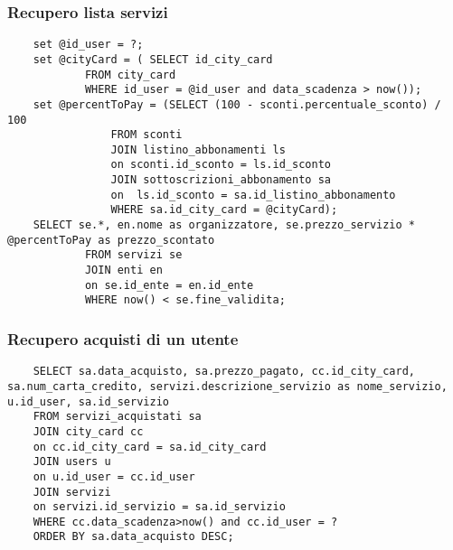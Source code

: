 \subsubsection{Recupero lista servizi}
\begin{lstlisting}
    set @id_user = ?;     
    set @cityCard = ( SELECT id_city_card
            FROM city_card
            WHERE id_user = @id_user and data_scadenza > now());
    set @percentToPay = (SELECT (100 - sconti.percentuale_sconto) / 100
                FROM sconti 
                JOIN listino_abbonamenti ls 
                on sconti.id_sconto = ls.id_sconto
                JOIN sottoscrizioni_abbonamento sa
                on  ls.id_sconto = sa.id_listino_abbonamento
                WHERE sa.id_city_card = @cityCard);
    SELECT se.*, en.nome as organizzatore, se.prezzo_servizio * @percentToPay as prezzo_scontato
            FROM servizi se
            JOIN enti en
            on se.id_ente = en.id_ente
            WHERE now() < se.fine_validita;
\end{lstlisting}

\subsubsection{Recupero acquisti di un utente}
\begin{lstlisting}
    SELECT sa.data_acquisto, sa.prezzo_pagato, cc.id_city_card, sa.num_carta_credito, servizi.descrizione_servizio as nome_servizio, u.id_user, sa.id_servizio
    FROM servizi_acquistati sa
    JOIN city_card cc
    on cc.id_city_card = sa.id_city_card
    JOIN users u
    on u.id_user = cc.id_user
    JOIN servizi
    on servizi.id_servizio = sa.id_servizio
    WHERE cc.data_scadenza>now() and cc.id_user = ?
    ORDER BY sa.data_acquisto DESC;
\end{lstlisting}



